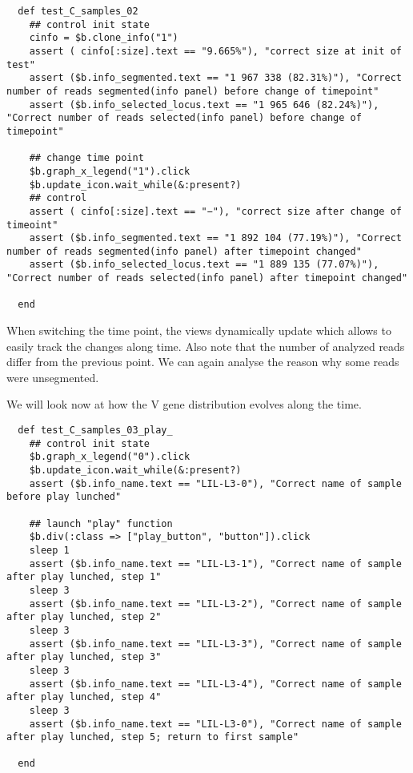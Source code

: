 \begin{verbatim}
  def test_C_samples_02
    ## control init state
    cinfo = $b.clone_info("1")
    assert ( cinfo[:size].text == "9.665%"), "correct size at init of test"
    assert ($b.info_segmented.text == "1 967 338 (82.31%)"), "Correct number of reads segmented(info panel) before change of timepoint"
    assert ($b.info_selected_locus.text == "1 965 646 (82.24%)"), "Correct number of reads selected(info panel) before change of timepoint"

    ## change time point
    $b.graph_x_legend("1").click
    $b.update_icon.wait_while(&:present?)
    ## control
    assert ( cinfo[:size].text == "−"), "correct size after change of timeoint"
    assert ($b.info_segmented.text == "1 892 104 (77.19%)"), "Correct number of reads segmented(info panel) after timepoint changed"
    assert ($b.info_selected_locus.text == "1 889 135 (77.07%)"), "Correct number of reads selected(info panel) after timepoint changed"

  end
\end{verbatim}

When switching the time point, the views dynamically update which allows to
easily track the changes along time. Also note that the number of analyzed
reads differ from the previous point. We can again analyse the reason why some
reads were unsegmented.

\bigskip

We will look now at how the V gene distribution evolves along the time.
\begin{verbatim}
  def test_C_samples_03_play_
    ## control init state
    $b.graph_x_legend("0").click
    $b.update_icon.wait_while(&:present?)
    assert ($b.info_name.text == "LIL-L3-0"), "Correct name of sample before play lunched"

    ## launch "play" function
    $b.div(:class => ["play_button", "button"]).click
    sleep 1
    assert ($b.info_name.text == "LIL-L3-1"), "Correct name of sample after play lunched, step 1"
    sleep 3
    assert ($b.info_name.text == "LIL-L3-2"), "Correct name of sample after play lunched, step 2" 
    sleep 3
    assert ($b.info_name.text == "LIL-L3-3"), "Correct name of sample after play lunched, step 3"
    sleep 3
    assert ($b.info_name.text == "LIL-L3-4"), "Correct name of sample after play lunched, step 4"
    sleep 3
    assert ($b.info_name.text == "LIL-L3-0"), "Correct name of sample after play lunched, step 5; return to first sample"

  end
\end{verbatim}

